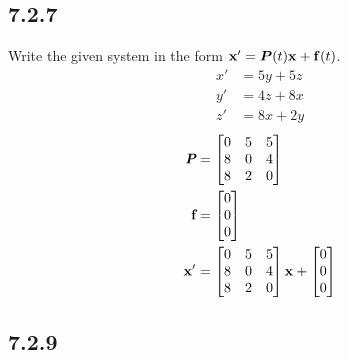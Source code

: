 \documentclass{article}
\begin{document}
\subsection{7.2.7}

Write the given system in the form $ \vect{x}' = \matr{P}(t)\vect{x} + \vect{f}(t) $.
\begin{align*}
	x' & = 5y + 5z \\
	y' & = 4z + 8x \\
	z' & = 8x + 2y
\end{align*}
\begin{align*}
	\matr{P} & =
		\begin{bmatrix}
			0 & 5 & 5 \\
			8 & 0 & 4 \\
			8 & 2 & 0
		\end{bmatrix} \\
	\vect{f} & =
		\begin{bmatrix}
			0 \\ 0 \\ 0
		\end{bmatrix} \\
	\vect{x}' & =
		\begin{bmatrix}
			0 & 5 & 5 \\
			8 & 0 & 4 \\
			8 & 2 & 0
		\end{bmatrix} \vect{x}
		+ \begin{bmatrix} 0 \\ 0 \\ 0 \end{bmatrix}
\end{align*}

\subsection{7.2.9}
\end{document}

